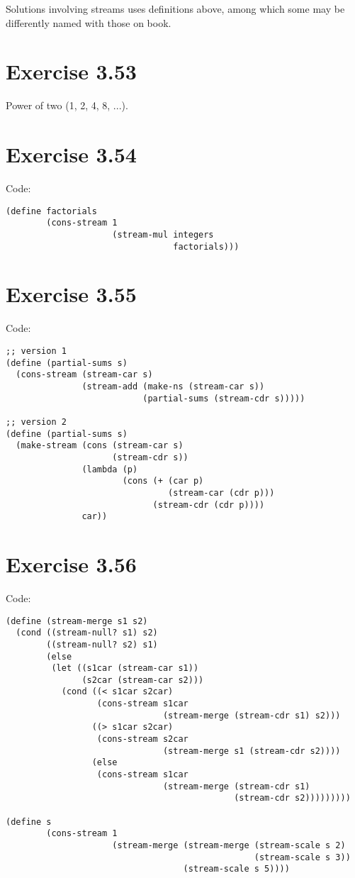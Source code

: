 \documentclass[../main.tex]{subfiles}
\begin{document}
Solutions involving streams uses definitions above, among which some may be differently named with those on book.

\section{Exercise 3.53}

Power of two (1, 2, 4, 8, ...).

\section{Exercise 3.54}

Code:

\begin{lstlisting}
(define factorials
        (cons-stream 1
                     (stream-mul integers
                                 factorials)))
\end{lstlisting}

\section{Exercise 3.55}

Code:

\begin{lstlisting}
;; version 1
(define (partial-sums s)
  (cons-stream (stream-car s)
               (stream-add (make-ns (stream-car s))
                           (partial-sums (stream-cdr s)))))

;; version 2
(define (partial-sums s)
  (make-stream (cons (stream-car s)
                     (stream-cdr s))
               (lambda (p)
                       (cons (+ (car p)
                                (stream-car (cdr p)))
                             (stream-cdr (cdr p))))
               car))
\end{lstlisting}

\section{Exercise 3.56}

Code:

\begin{lstlisting}
(define (stream-merge s1 s2)
  (cond ((stream-null? s1) s2)
        ((stream-null? s2) s1)
        (else
         (let ((s1car (stream-car s1))
               (s2car (stream-car s2)))
           (cond ((< s1car s2car)
                  (cons-stream s1car
                               (stream-merge (stream-cdr s1) s2)))
                 ((> s1car s2car)
                  (cons-stream s2car
                               (stream-merge s1 (stream-cdr s2))))
                 (else
                  (cons-stream s1car
                               (stream-merge (stream-cdr s1)
                                             (stream-cdr s2)))))))))

(define s
        (cons-stream 1
                     (stream-merge (stream-merge (stream-scale s 2)
                                                 (stream-scale s 3))
                                   (stream-scale s 5))))
\end{lstlisting}
\end{document}
